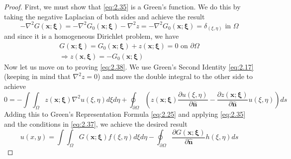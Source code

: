 \documentclass{article}
\newcommand{\pd}[2]{\frac{\partial #1}{\partial #2}}
\newcommand{\vb}[1]{\mathbf{ #1}}
\newcommand{\lap}{\nabla ^2}
\newcommand{\pull}{\! \! \!}
\newcommand{\dint}{\int \pull \int}
\newcommand{\fsgf}{G_0(\vb{x};\boldsymbol{\xi})}
\newcommand{\ggf}{G(\vb{x}; \boldsymbol{\xi})}
\newcommand{\un}{\mathbf{\hat{n}}}
\numberwithin{equation}{section}
\begin{document}
\begin{proof}
    First, we must show that \eqref{eq:2.35} is a Green's function. We do this by taking the negative Laplacian of both sides and achieve the result 
    \begin{equation*}
        -\lap \ggf = -\lap \fsgf - \lap z = -\lap \fsgf = \delta_{(\xi, \eta)} \text{ in } \Omega \label{eq:2.37}
    \end{equation*}
    and since it is a homogeneous Dirichlet problem, we have 
    \begin{equation*}
    \begin{split}
        \ggf = \fsgf + z(\vb{x}; \boldsymbol{\xi}) =0\text{ on } \partial \Omega \\ \Rightarrow z(\vb{x},\boldsymbol{\xi}) = -\fsgf 
    \end{split}
    \end{equation*}
    Now let us move on to proving \eqref{eq:2.38}. We use Green's Second Identity \eqref{eq:2.17} (keeping in mind that $\lap z = 0$) and move the double integral to the other side to achieve
    \begin{equation*}
        0=-\dint_\Omega z(\vb{x}; \boldsymbol{\xi}) \lap u(\xi, \eta) d\xi d\eta + \oint_{\partial \Omega} \left( z(\vb{x}; \boldsymbol{\xi}) \pd{u(\xi, \eta)}{\un} - \pd{z(\vb{x}; \boldsymbol{\xi})}{\un}u(\xi, \eta)\right) ds
    \end{equation*}
    Adding this to Green's Representation Formula \eqref{eq:2.25} and applying \eqref{eq:2.35} and the conditions in \eqref{eq:2.37}, we achieve the desired result
    \begin{equation*}
        u(x,y) = \dint_\Omega \ggf f(\xi,\eta) d\xi d\eta - \oint_{\partial \Omega} \pd{\ggf}{\un} h(\xi, \eta) ds 
    \end{equation*}
\end{proof} 
\end{document}
